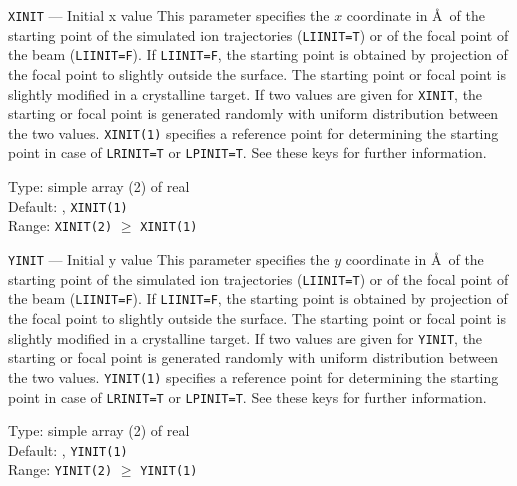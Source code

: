 \begin{keydescription}{\texttt{XINIT} --- Initial x value}
%
  This parameter specifies the $x$ coordinate in \AA\ of the starting point of
  the simulated ion trajectories (\texttt{LIINIT=T}) or of the focal point of the
  beam (\texttt{LIINIT=F}). If \texttt{LIINIT=F}, the starting point is obtained
  by projection of the focal point to slightly outside the surface. The starting
  point or focal point is slightly modified in a crystalline target. If
  two values are given for \texttt{XINIT}, the starting or focal point is
  generated randomly with uniform distribution between the two values.
  \ifprivate 
    \texttt{XINIT(1)} specifies a reference point for determining the
    starting point in case of \texttt{LRINIT=T} or \texttt{LPINIT=T}.
    See these keys for further information.
  \fi
%
  \begin{keytab}
    Type:    \> simple array (2) of real \\
    Default: , \texttt{XINIT(1)} \\
    Range:   \> \texttt{XINIT(2)} $\ge$ \texttt{XINIT(1)}
  \end{keytab}
\end{keydescription}

\begin{keydescription}{\texttt{YINIT} --- Initial y value}
%
  This parameter specifies the $y$ coordinate in \AA\ of the starting point of
  the simulated ion trajectories (\texttt{LIINIT=T}) or of the focal point of the
  beam (\texttt{LIINIT=F}). If \texttt{LIINIT=F}, the starting point is obtained
  by projection of the focal point to slightly outside the surface. The starting
  point or focal point is slightly modified in a crystalline target. If
  two values are given for \texttt{YINIT}, the starting or focal point is
  generated randomly with uniform distribution between the two values.
  \ifprivate 
    \texttt{YINIT(1)} specifies a reference point for determining the
    starting point in case of \texttt{LRINIT=T} or \texttt{LPINIT=T}.
    See these keys for further information.
  \fi
%
  \begin{keytab}
    Type:    \> simple array (2) of real \\
    Default: , \texttt{YINIT(1)} \\
    Range:   \> \texttt{YINIT(2)} $\ge$ \texttt{YINIT(1)}
  \end{keytab}
\end{keydescription}

